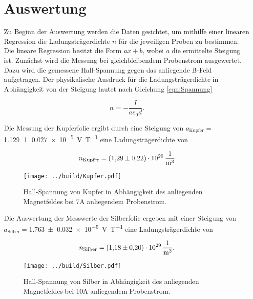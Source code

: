 


\section{Auswertung}
\label{sec:Auswertung}

\noindent Zu Beginn der Auswertung werden die Daten gesichtet, um mithilfe einer linearen Regression 
die Ladungsträgerdichte $n$ für die jeweiligen Proben zu bestimmen. Die lineare Regression besitzt die Form $ax+b$, wobei $a$ 
die ermittelte Steigung ist. 
Zunächst wird die Messung bei gleichbleibendem Probenstrom ausgewertet. 
Dazu wird die gemessene Hall-Spannung gegen das anliegende B-Feld aufgetragen. 
Der physikalische Ausdruck für die Ladungsträgerdichte in Abhängigkeit von der Steigung lautet nach 
Gleichung \eqref{eqn:Spannung} 

\begin{equation*}
    n = - \frac{I}{a e_0 d}.
\end{equation*}

\noindent Die Messung der Kupferfolie ergibt durch eine Steigung von $a_\text{Kupfer}=$\qty{1.129\pm 0.027e-5}{\volt\per\tesla} eine 
Ladungsträgerdichte von 

\begin{equation*}
    n_\text{Kupfer} = \qty{1.29\pm0.22e29}{\per\cubic\meter}
\end{equation*}

\begin{figure}[H]
    \label{Kupfer}
    \texttt{[image: ../build/Kupfer.pdf]}
    \caption{Hall-Spannung von Kupfer in Abhängigkeit des anliegenden Magnetfeldes bei 7A anliegendem Probenstrom.}
\end{figure}

\noindent Die Auswertung der Messwerte der Silberfolie ergeben mit einer Steigung von $a_\text{Silber}=$\qty{1.763\pm 0.032e-5}{\volt\per\tesla} eine 
Ladungsträgerdichte von 

\begin{equation*}
    n_\text{Silber} = \qty{1.18\pm0.2e29}{\per\cubic\meter}.
\end{equation*}

\begin{figure}[H]
    \label{Silber}
    \texttt{[image: ../build/Silber.pdf]}
    \caption{Hall-Spannung von Silber in Abhängigkeit des anliegenden Magnetfeldes bei 10A anliegendem Probenstrom.}
\end{figure}

